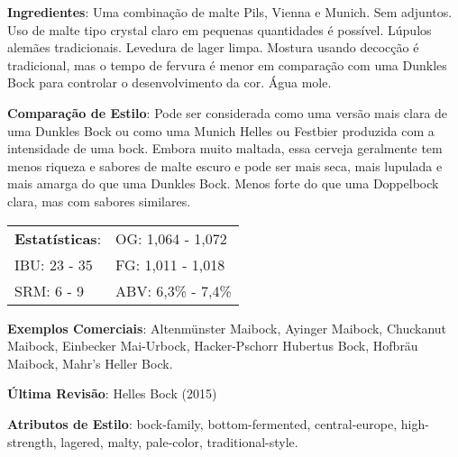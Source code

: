 \textbf{Ingredientes}: Uma combinação de malte Pils, Vienna e Munich. Sem adjuntos. Uso de malte tipo crystal claro em pequenas quantidades é possível. Lúpulos alemães tradicionais. Levedura de lager limpa. Mostura usando decocção é tradicional, mas o tempo de fervura é menor em comparação com uma Dunkles Bock para controlar o desenvolvimento da cor. Água mole.

\textbf{Comparação de Estilo}: Pode ser considerada como uma versão mais clara de uma Dunkles Bock ou como uma Munich Helles ou Festbier produzida com a intensidade de uma bock. Embora muito maltada, essa cerveja geralmente tem menos riqueza e sabores de malte escuro e pode ser mais seca, mais lupulada e mais amarga do que uma Dunkles Bock. Menos forte do que uma Doppelbock clara, mas com sabores similares.

\begin{tabular}{@{}p{35mm}p{35mm}@{}}
  \textbf{Estatísticas}: & OG: 1,064 - 1,072 \\
  IBU: 23 - 35  & FG: 1,011 - 1,018  \\
  SRM: 6 - 9  & ABV: 6,3\% - 7,4\%
\end{tabular}

\textbf{Exemplos Comerciais}: Altenmünster Maibock, Ayinger Maibock, Chuckanut Maibock, Einbecker Mai-Urbock, Hacker-Pschorr Hubertus Bock, Hofbräu Maibock, Mahr’s Heller Bock.

\textbf{Última Revisão}: Helles Bock (2015)

\textbf{Atributos de Estilo}: bock-family, bottom-fermented, central-europe, high-strength, lagered, malty, pale-color, traditional-style.
